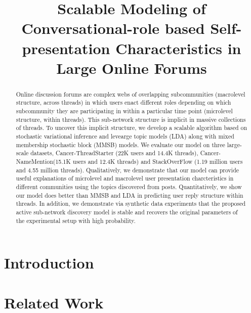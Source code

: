 \documentclass{sig-alternate}
\title{Scalable Modeling of Conversational-role based Self-presentation
Characteristics in Large Online Forums}
\begin{document}
\maketitle
\begin{abstract}

Online discussion forums are complex webs of overlapping subcommunities 
(macrolevel structure, across threads) in which users enact different roles 
depending on which subcommunity they are participating in within a particular 
time point (microlevel structure, within threads).  This sub-network structure 
is implicit in massive collections of threads. To uncover this implicit structure, 
we develop a scalable algorithm based on stochastic variational inference and 
levearge topic models (LDA) along with mixed membership stochastic block (MMSB) 
models. We evaluate our model on three large-scale datasets, Cancer-ThreadStarter (22K
users and 14.4K threads), Cancer-NameMention(15.1K users and 12.4K threads) and
StackOverFlow (1.19 million users and 4.55 million threads). Qualitatively, we
demonstrate that our model can provide useful explanations of microlevel
and macrolevel user presentation charcteristics in different communities
using the topics discovered from posts. Quantitatively, we show our model
does better than MMSB and LDA in predicting user reply structure within threads. 
In addition, we demonstrate via synthetic 
data experiments that the proposed active sub-network discovery
model is stable and recovers the original parameters of the experimental
setup with high probability.







\end{abstract}

\section{Introduction}


\section{Related Work}


\end{document}

